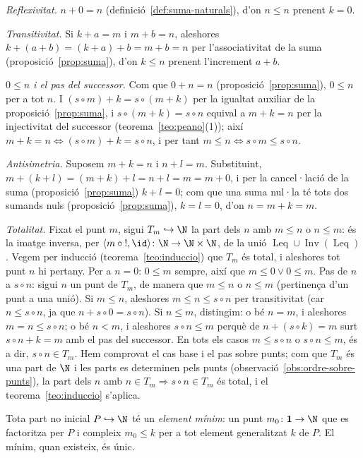 \begin{prova}
\emph{Reflexivitat.} \(n+0=n\) (definició~\ref{def:suma-naturals}), d'on
\(n\le n\) prenent \(k=0\).

\emph{Transitivitat.} Si \(k+a=m\) i \(m+b=n\), aleshores
\(k+(a+b)=(k+a)+b=m+b=n\) per l'associativitat de la suma
(proposició~\ref{prop:suma}), d'on \(k\le n\) prenent l'increment
\(a+b\).

\emph{\(0\le n\) i el pas del successor.} Com que \(0+n=n\)
(proposició~\ref{prop:suma}), \(0\le n\) per a tot \(n\). I
\((s\circ m)+k=s\circ(m+k)\) per la igualtat auxiliar de la
proposició~\ref{prop:suma}, i \(s\circ(m+k)=s\circ n\) equival a \(m+k=n\)
per la injectivitat del successor (teorema~\ref{teo:peano}(1)); així
\(m+k=n\Leftrightarrow(s\circ m)+k=s\circ n\), i per tant \(m\le n\Leftrightarrow s\circ m\le
s\circ n\).

\emph{Antisimetria.} Suposem \(m+k=n\) i \(n+l=m\). Substituint,
\(m+(k+l)=(m+k)+l=n+l=m=m+0\), i per la cancel·lació de la suma
(proposició~\ref{prop:suma}) \(k+l=0\); com que una suma nul·la té tots dos
sumands nuls (proposició~\ref{prop:suma}), \(k=l=0\), d'on \(n=m+k=m\).

\emph{Totalitat.} Fixat el punt \(m\), sigui \(T_m\hookrightarrow\N\) la
part dels \(n\) amb \(m\le n\) o \(n\le m\): és la imatge inversa, per
\(\langle m\circ{!},\id\rangle\colon\N\to\N\times\N\), de la unió
\(\operatorname{Leq}\cup\operatorname{Inv}(\operatorname{Leq})\). Vegem
per inducció (teorema~\ref{teo:induccio}) que \(T_m\) és total, i
aleshores tot punt \(n\) hi pertany. Per a \(n=0\): \(0\le m\) sempre, així que
\(m\le0\vee0\le m\). Pas de \(n\) a \(s\circ n\): sigui \(n\) un punt de \(T_m\), de manera que
\(m\le n\) o \(n\le m\) (pertinença d'un punt a una unió). Si \(m\le n\), aleshores \(m\le n\le
s\circ n\) per transitivitat (car \(n\le s\circ n\), ja que
\(n+s\circ0=s\circ n\)). Si \(n\le m\), distingim: o bé \(n=m\), i
aleshores \(m=n\le s\circ n\); o bé \(n<m\), i aleshores \(s\circ n\le m\)
perquè de \(n+(s\circ k)=m\) surt \(s\circ n+k=m\) amb el pas del
successor. En tots els casos \(m\le s\circ n\) o \(s\circ n\le m\), és a dir,
\(s\circ n\in T_m\). Hem comprovat el cas base i el pas sobre punts;
com que \(T_m\) és una part de \(\N\) i les parts es determinen pels
punts (observació~\ref{obs:ordre-sobre-punts}), la part dels \(n\) amb
\(n\in T_m\Rightarrow s\circ n\in T_m\) és total, i el
teorema~\ref{teo:induccio} s'aplica.
\end{prova}

\begin{teorema}\label{teo:bon-ordre-N}
Tota part no inicial \(P\hookrightarrow\N\) té un \emph{element mínim}: un
punt \(m_0\colon\mathbf1\to\N\) que es factoritza per \(P\) i compleix
\(m_0\le k\) per a tot element generalitzat \(k\) de \(P\). El mínim, quan
existeix, és únic.
\end{teorema}

